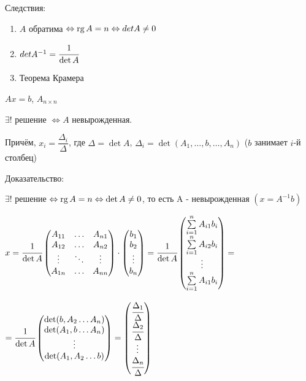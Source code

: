 Следствия:
\begin{enumerate}
    \item \(A\) обратима \(\Leftrightarrow \operatorname{rg} A = n \Leftrightarrow det A \neq 0\)

    \item \(det A^{-1} = \cfrac{1}{\det A }\)

    \item Теорема Крамера
\end{enumerate}


\(Ax = b\), \(A_{n\times n}\)

\(\exists! \) решение \(\Leftrightarrow A\) невырожденная.

Причём, \(x_i = \dfrac{\Delta_i}{\Delta}\), где \(\Delta = \det A\), \(\Delta_i = \det (A_1, \ldots, b, \ldots, A_n)\) (\(b\) занимает \(i\)-й столбец)


Доказательство:

\(\exists! \) решение \(\Leftrightarrow \operatorname{rg} A = n \Leftrightarrow \det A \neq 0\), то есть A - невырожденная $(x = A^{-1}b)$

\(x = \cfrac{1}{\det A} \begin{pmatrix}
    A_{11} & \ldots & A_{n1} \\
    A_{12} & \ldots & A_{n2} \\
    \vdots & \ddots & \vdots \\
    A_{1n} & \ldots & A_{nn} \\
\end{pmatrix} \cdot
\begin{pmatrix}
    b_1    \\
    b_2    \\
    \vdots \\
    b_n
\end{pmatrix}
=
\cfrac{1}{\det A}
\begin{pmatrix}
    \sum\limits_{i=1}^n A_{i1}b_i \\
    \sum\limits_{i=1}^n A_{i2}b_i \\
    \vdots                        \\
    \sum\limits_{i=1}^n A_{i1}b_i
\end{pmatrix} =\)

\(=\cfrac{1}{\det A}
\begin{pmatrix}
    \det (b,A_2\ldots A_n) \\
    \det (A_1,b\ldots A_n) \\
    \vdots                 \\
    \det (A_1,A_2\ldots b)
\end{pmatrix} =
\begin{pmatrix}
    \cfrac{\Delta_1}{\Delta} \\
    \cfrac{\Delta_2}{\Delta} \\
    \vdots                   \\
    \cfrac{\Delta_n}{\Delta}
\end{pmatrix}\)


